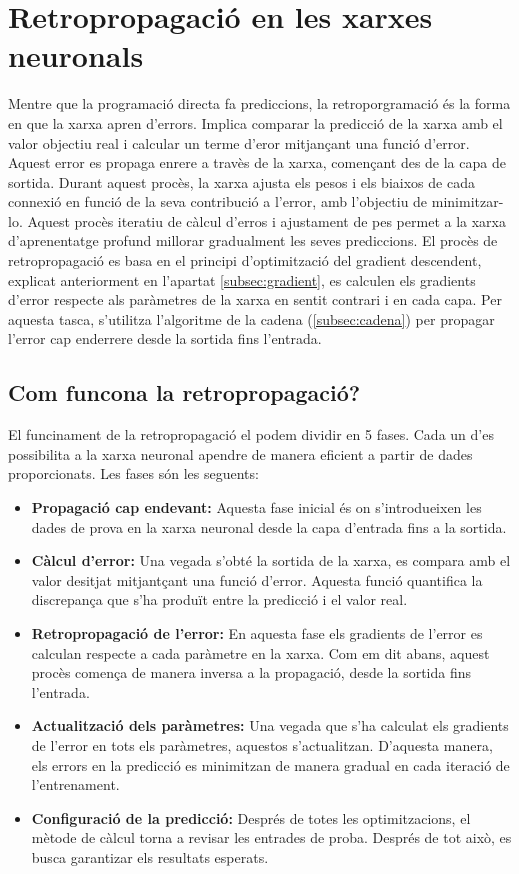 \section{Retropropagació en les xarxes neuronals}\label{subsec:retropropagació}
Mentre que la programació directa fa prediccions, la retroporgramació és la forma en que la xarxa apren d'errors. Implica comparar la predicció de la xarxa amb el valor objectiu real i calcular un terme d'eror mitjançant una funció d'error.
Aquest error es propaga enrere a travès de la xarxa, començant des de la capa de sortida. Durant aquest procès, la xarxa ajusta els pesos i els biaixos de cada connexió en funció de la seva contribució a l'error, amb l'objectiu de minimitzar-lo.
Aquest procès iteratiu de càlcul d'erros i ajustament de pes permet a la xarxa d'aprenentatge profund millorar gradualment les seves prediccions.
El procès de retropropagació es basa en el principi d'optimització del gradient descendent, explicat anteriorment en l'apartat \ref{subsec:gradient}, es calculen els gradients d'error respecte als paràmetres de la xarxa en sentit contrari i en cada capa. Per aquesta tasca, s'utilitza l'algoritme de la cadena (\ref{subsec:cadena}) per propagar l'error cap enderrere desde la sortida fins l'entrada.

\subsection{Com funcona la retropropagació?}
El funcinament de la retropropagació el podem dividir en 5 fases. Cada un d'es possibilita a la xarxa neuronal apendre de manera eficient a partir de dades proporcionats. Les fases són les seguents:
\begin{itemize}
 \item \textbf{Propagació cap endevant:} Aquesta fase inicial és on s'introdueixen les dades de prova en la xarxa neuronal desde la capa d'entrada fins a la sortida.
 \item \textbf{Càlcul d'error:} Una vegada s'obté la sortida de la xarxa, es compara amb el valor desitjat mitjantçant una funció d'error. Aquesta funció quantifica la discrepança que s'ha produït entre la predicció i el valor real.
 \item \textbf{Retropropagació de l'error:} En aquesta fase els gradients de l'error es calculan respecte a cada paràmetre en la xarxa. Com em dit abans, aquest procès comença de manera inversa a la propagació, desde la sortida fins l'entrada.
 \item \textbf{Actualització dels paràmetres:} Una vegada que s'ha calculat els gradients de l'error en tots els paràmetres, aquestos s'actualitzan. D'aquesta manera, els errors en la predicció es minimitzan de manera gradual en cada iteració de l'entrenament.
 \item \textbf{Configuració de la predicció:} Després de totes les optimitzacions, el mètode de càlcul torna a revisar les entrades de proba. Després de tot això, es busca garantizar els resultats esperats.
\end{itemize}
